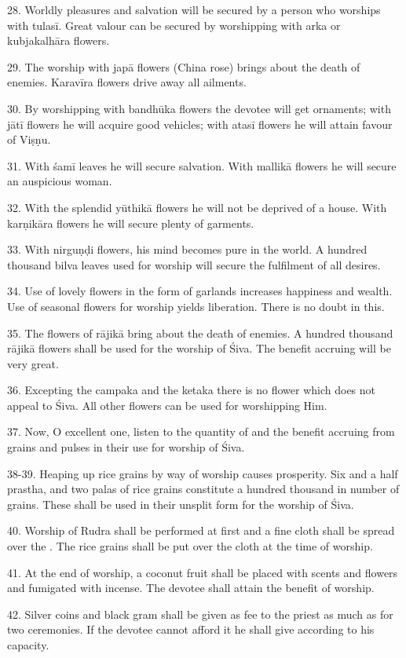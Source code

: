 28. Worldly pleasures and salvation will be secured by a person who worships
with tulasī. Great valour can be secured by worshipping with arka or
kubjakalhāra flowers.

29. The worship with japā flowers (China rose) brings about the death of enemies.
Karavīra flowers drive away all ailments.

30. By worshipping with bandhūka flowers the devotee will get ornaments; with
jātī flowers he will acquire good vehicles; with atasī flowers he will attain
favour of Viṣṇu.

31. With śamī leaves he will secure salvation. With mallikā flowers he will
secure an auspicious woman.

32. With the splendid yūthikā flowers he will not be deprived of a house. With
karṇikāra flowers he will secure plenty of garments.

33. With nirguṇḍi flowers, his mind becomes pure in the world. A hundred
thousand bilva leaves used for worship will secure the fulfilment of all desires.

34. Use of lovely flowers in the form of garlands increases happiness and wealth.
Use of seasonal flowers for worship yields liberation. There is no doubt in this.

35. The flowers of rājikā bring about the death of enemies. A hundred thousand
rājikā flowers shall be used for the worship of Śiva. The benefit accruing will
be very great.

36. Excepting the campaka and the ketaka there is no flower which does not
appeal to Śiva. All other flowers can be used for worshipping Him.

37. Now, O excellent one, listen to the quantity of and the benefit accruing
from grains and pulses in their use for worship of Śiva.

38-39. Heaping up rice grains by way of worship causes prosperity. Six and
a half prastha, and two palas of rice grains constitute a hundred thousand in
number of grains. These shall be used in their unsplit form for the worship of
Śiva.

40. Worship of Rudra shall be performed at first and a fine cloth shall be
spread over the . The rice grains shall be put over the cloth at
the time of worship.

41. At the end of worship, a coconut fruit shall be placed with scents and
flowers \etc and fumigated with incense. The devotee shall attain the benefit
of worship.

42. Silver coins and black gram shall be given as fee to the priest as much as
for two  ceremonies. If the devotee cannot afford it he shall
give according to his capacity.


